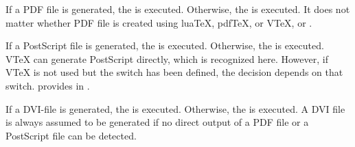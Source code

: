 \iffalse %
\begin{Declaration}
  \Macro{scr@ifpdftex}%
  \Parameter{then code}\Parameter{else code}%
\end{Declaration}
If you use pdf\TeX{}, the \PName{then code} will be executed. Otherwise, the
\PName{else code} will be executed. It does not matter whether a PDF-file is
actually generated or not. This test is rarely useful. As a rule, you should
test directly for the command you want instead.%
\EndIndexGroup
\fi

\iffalse %
\begin{Declaration}
  \Macro{scr@ifVTeX}%
  \Parameter{then code}\Parameter{else code}%
\end{Declaration}
If you use V\TeX{}, the \PName{then code} is executed. Otherwise, the
\PName{else code} is executed. This test is seldom useful. As a rule,
you should test directly for the command you want instead.%
%
\EndIndexGroup
\fi


\begin{Declaration}
\end{Declaration}
If a PDF file is generated, the
 is executed. Otherwise, the  is
executed. It does not matter whether PDF file is created using lua\TeX{},
pdf\TeX{}, or V\TeX{}, or \XeTeX{}.%
\EndIndexGroup


\begin{Declaration}
\end{Declaration}
If a PostScript file is generated, the
 is executed.  Otherwise, the  is
executed. V\TeX{} can generate PostScript directly, which is recognized
here. However, if V\TeX{} is not used but the switch  has been
defined, the decision depends on that switch. \KOMAScript{} provides
 in
\hyperref[cha:typearea]{}%
.
%
\EndIndexGroup


\begin{Declaration}
\end{Declaration}
If a DVI-file is generated, the
 is executed. Otherwise, the  is
executed. A DVI file is always assumed to be generated if no direct output of
a PDF file or a PostScript file can be detected.%
\EndIndexGroup


